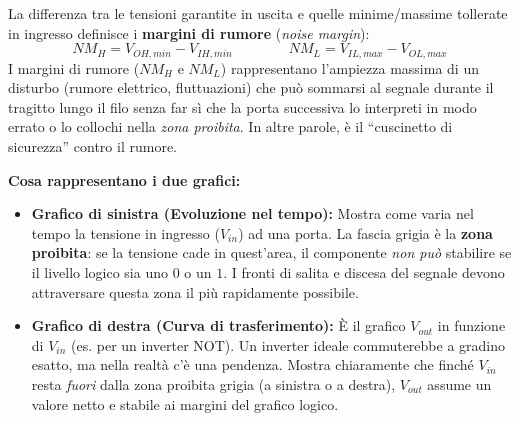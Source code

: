 La differenza tra le tensioni garantite in uscita e quelle minime/massime tollerate in ingresso definisce i \textbf{margini di rumore} (\emph{noise margin}):
\[
NM_H = V_{OH,min} - V_{IH,min} \qquad\qquad
NM_L = V_{IL,max} - V_{OL,max}
\]
I margini di rumore ($NM_H$ e $NM_L$) rappresentano l'ampiezza massima di un disturbo (rumore elettrico, fluttuazioni) che può sommarsi al segnale durante il tragitto lungo il filo senza far sì che la porta successiva lo interpreti in modo errato o lo collochi nella \emph{zona proibita}. In altre parole, è il ``cuscinetto di sicurezza'' contro il rumore.

\begin{center}
\qquad
{}
\end{center}

\noindent\textbf{Cosa rappresentano i due grafici:}
\begin{itemize}[leftmargin=1.5em]
    \item \textbf{Grafico di sinistra (Evoluzione nel tempo):} Mostra come varia nel tempo la tensione in ingresso ($V_{in}$) ad una porta. La fascia grigia è la \textbf{zona proibita}: se la tensione cade in quest'area, il componente \emph{non può} stabilire se il livello logico sia uno $0$ o un $1$. I fronti di salita e discesa del segnale devono attraversare questa zona il più rapidamente possibile.
    \item \textbf{Grafico di destra (Curva di trasferimento):} È il grafico $V_{out}$ in funzione di $V_{in}$ (es. per un inverter NOT). Un inverter ideale commuterebbe a gradino esatto, ma nella realtà c'è una pendenza. Mostra chiaramente che finché $V_{in}$ resta \emph{fuori} dalla zona proibita grigia (a sinistra o a destra), $V_{out}$ assume un valore netto e stabile ai margini del grafico logico.
\end{itemize}

